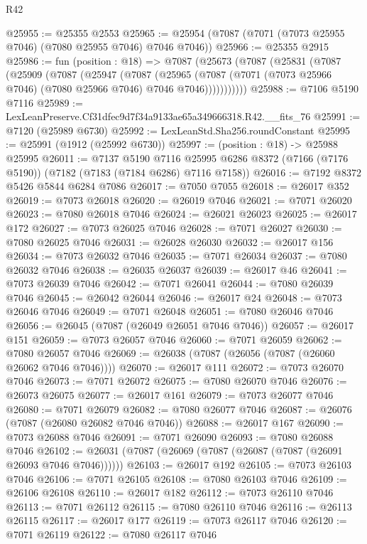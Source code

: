 \begin{lexlean}{R42}
\begin{coremodule}
{@25955 := @25355 @2553
@25965 := @25954 (@7087 (@7071 (@7073 @25955 @7046) (@7080 @25955 @7046) @7046 @7046))
@25966 := @25355 @2915
@25986 := fun (position : @18) =>
  @7087
    (@25673
      (@7087
        (@25831
          (@7087
            (@25909
              (@7087
                (@25947
                  (@7087
                    (@25965
                      (@7087 (@7071 (@7073 @25966 @7046) (@7080 @25966 @7046) @7046 @7046)))))))))))
@25988 := @7106 @5190 @7116
@25989 := LexLeanPreserve.Cf31dfec9d7f34a9133ae65a349666318.R42.__fits_76
@25991 := @7120 (@25989 @6730)
@25992 := LexLeanStd.Sha256.roundConstant
@25995 := @25991 (@1912 (@25992 @6730))
@25997 := (position : @18) -> @25988 @25995
@26011 := @7137
    @5190
    @7116
    @25995
    @6286
    @8372
    (@7166 (@7176 @5190))
    (@7182 (@7183 (@7184 @6286) @7116 @7158))
@26016 := @7192 @8372 @5426 @5844 @6284 @7086
@26017 := @7050 @7055
@26018 := @26017 @352
@26019 := @7073 @26018
@26020 := @26019 @7046
@26021 := @7071 @26020
@26023 := @7080 @26018 @7046
@26024 := @26021 @26023
@26025 := @26017 @172
@26027 := @7073 @26025 @7046
@26028 := @7071 @26027
@26030 := @7080 @26025 @7046
@26031 := @26028 @26030
@26032 := @26017 @156
@26034 := @7073 @26032 @7046
@26035 := @7071 @26034
@26037 := @7080 @26032 @7046
@26038 := @26035 @26037
@26039 := @26017 @46
@26041 := @7073 @26039 @7046
@26042 := @7071 @26041
@26044 := @7080 @26039 @7046
@26045 := @26042 @26044
@26046 := @26017 @24
@26048 := @7073 @26046 @7046
@26049 := @7071 @26048
@26051 := @7080 @26046 @7046
@26056 := @26045 (@7087 (@26049 @26051 @7046 @7046))
@26057 := @26017 @151
@26059 := @7073 @26057 @7046
@26060 := @7071 @26059
@26062 := @7080 @26057 @7046
@26069 := @26038 (@7087 (@26056 (@7087 (@26060 @26062 @7046 @7046))))
@26070 := @26017 @111
@26072 := @7073 @26070 @7046
@26073 := @7071 @26072
@26075 := @7080 @26070 @7046
@26076 := @26073 @26075
@26077 := @26017 @161
@26079 := @7073 @26077 @7046
@26080 := @7071 @26079
@26082 := @7080 @26077 @7046
@26087 := @26076 (@7087 (@26080 @26082 @7046 @7046))
@26088 := @26017 @167
@26090 := @7073 @26088 @7046
@26091 := @7071 @26090
@26093 := @7080 @26088 @7046
@26102 := @26031 (@7087 (@26069 (@7087 (@26087 (@7087 (@26091 @26093 @7046 @7046))))))
@26103 := @26017 @192
@26105 := @7073 @26103 @7046
@26106 := @7071 @26105
@26108 := @7080 @26103 @7046
@26109 := @26106 @26108
@26110 := @26017 @182
@26112 := @7073 @26110 @7046
@26113 := @7071 @26112
@26115 := @7080 @26110 @7046
@26116 := @26113 @26115
@26117 := @26017 @177
@26119 := @7073 @26117 @7046
@26120 := @7071 @26119
@26122 := @7080 @26117 @7046
}
\end{coremodule}
\end{lexlean}
